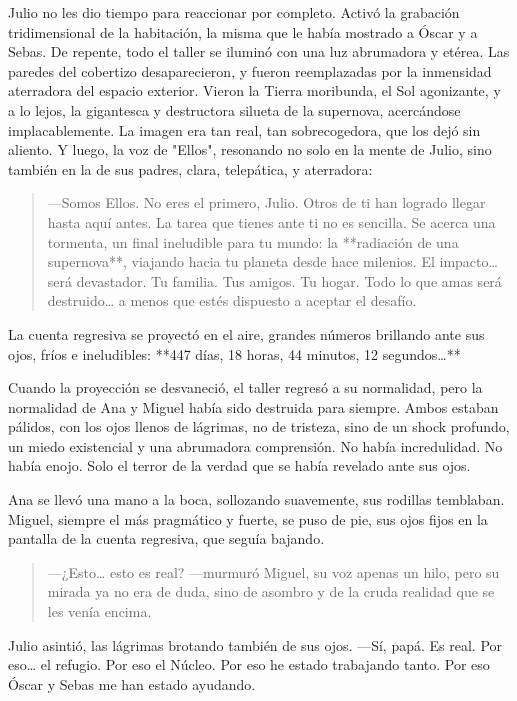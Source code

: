 \documentclass[a4paper,12pt]{book}
\begin{document}
Julio no les dio tiempo para reaccionar por completo. Activó la grabación tridimensional de la habitación, la misma que le había mostrado a Óscar y a Sebas. De repente, todo el taller se iluminó con una luz abrumadora y etérea. Las paredes del cobertizo desaparecieron, y fueron reemplazadas por la inmensidad aterradora del espacio exterior. Vieron la Tierra moribunda, el Sol agonizante, y a lo lejos, la gigantesca y destructora silueta de la supernova, acercándose implacablemente. La imagen era tan real, tan sobrecogedora, que los dejó sin aliento. Y luego, la voz de "Ellos", resonando no solo en la mente de Julio, sino también en la de sus padres, clara, telepática, y aterradora:

\begin{quote}
    —Somos Ellos. No eres el primero, Julio. Otros de ti han logrado llegar hasta aquí antes. La tarea que tienes ante ti no es sencilla. Se acerca una tormenta, un final ineludible para tu mundo: la **radiación de una supernova**, viajando hacia tu planeta desde hace milenios. El impacto… será devastador. Tu familia. Tus amigos. Tu hogar. Todo lo que amas será destruido… a menos que estés dispuesto a aceptar el desafío.
\end{quote}

La cuenta regresiva se proyectó en el aire, grandes números brillando ante sus ojos, fríos e ineludibles: **447 días, 18 horas, 44 minutos, 12 segundos…**

Cuando la proyección se desvaneció, el taller regresó a su normalidad, pero la normalidad de Ana y Miguel había sido destruida para siempre. Ambos estaban pálidos, con los ojos llenos de lágrimas, no de tristeza, sino de un shock profundo, un miedo existencial y una abrumadora comprensión. No había incredulidad. No había enojo. Solo el terror de la verdad que se había revelado ante sus ojos.

Ana se llevó una mano a la boca, sollozando suavemente, sus rodillas temblaban. Miguel, siempre el más pragmático y fuerte, se puso de pie, sus ojos fijos en la pantalla de la cuenta regresiva, que seguía bajando.

\begin{quote}
    —¿Esto… esto es real? —murmuró Miguel, su voz apenas un hilo, pero su mirada ya no era de duda, sino de asombro y de la cruda realidad que se les venía encima.
\end{quote}

Julio asintió, las lágrimas brotando también de sus ojos. —Sí, papá. Es real. Por eso… el refugio. Por eso el Núcleo. Por eso he estado trabajando tanto. Por eso Óscar y Sebas me han estado ayudando.
\end{document}
